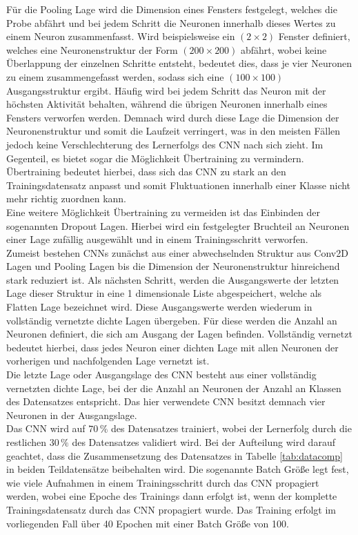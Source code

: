 Für die Pooling Lage wird die Dimension eines Fensters festgelegt, welches die Probe abfährt und bei jedem Schritt die Neuronen innerhalb dieses Wertes zu einem Neuron zusammenfasst. Wird beispielsweise ein $(2\times 2)$ Fenster definiert, welches eine Neuronenstruktur der Form $(200 \times 200)$ abfährt, wobei keine Überlappung der einzelnen Schritte entsteht, bedeutet dies, dass je vier Neuronen zu einem zusammengefasst werden, sodass sich eine $(100\times 100)$ Ausgangsstruktur ergibt. Häufig wird bei jedem Schritt das Neuron mit der höchsten Aktivität behalten, während die übrigen Neuronen innerhalb eines Fensters verworfen werden. Demnach wird durch diese Lage die Dimension der Neuronenstruktur und somit die Laufzeit verringert, was in den meisten Fällen jedoch keine Verschlechterung des Lernerfolgs des CNN nach sich zieht. Im Gegenteil, es bietet sogar die Möglichkeit Übertraining zu vermindern. Übertraining bedeutet hierbei, dass sich das CNN zu stark an den Trainingsdatensatz anpasst und somit Fluktuationen innerhalb einer Klasse nicht mehr richtig zuordnen kann. \\
Eine weitere Möglichkeit Übertraining zu vermeiden ist das Einbinden der sogenannten Dropout Lagen. Hierbei wird ein festgelegter Bruchteil an Neuronen einer Lage zufällig ausgewählt und in einem Trainingsschritt verworfen. \\
Zumeist bestehen CNNs zunächst aus einer abwechselnden Struktur aus Conv2D Lagen und Pooling Lagen bis die Dimension der Neuronenstruktur hinreichend stark reduziert ist. Als nächsten Schritt, werden die Ausgangswerte der letzten Lage dieser Struktur in eine 1 dimensionale Liste abgespeichert, welche als Flatten Lage bezeichnet wird. Diese Ausgangswerte werden wiederum in vollständig vernetzte dichte Lagen übergeben. Für diese werden die Anzahl an Neuronen definiert, die sich am Ausgang der Lagen befinden. Vollständig vernetzt bedeutet hierbei, dass jedes Neuron einer dichten Lage mit allen Neuronen der vorherigen und nachfolgenden Lage vernetzt ist.  \\
Die letzte Lage oder Ausgangslage des CNN besteht aus einer vollständig vernetzten dichte Lage, bei der die Anzahl an Neuronen der Anzahl an Klassen des Datensatzes entspricht. Das hier verwendete CNN besitzt demnach vier Neuronen in der Ausgangslage. \\
Das CNN wird auf $70\,\%$ des Datensatzes trainiert, wobei der Lernerfolg durch die restlichen $30\,\%$ des Datensatzes validiert wird. Bei der Aufteilung wird darauf geachtet, dass die Zusammensetzung des Datensatzes in Tabelle \ref{tab:datacomp} in beiden Teildatensätze beibehalten wird. Die sogenannte Batch Größe legt fest, wie viele Aufnahmen in einem Trainingsschritt durch das CNN propagiert werden, wobei eine Epoche des Trainings dann erfolgt ist, wenn der komplette Trainingsdatensatz durch das CNN propagiert wurde. Das Training erfolgt im vorliegenden Fall über 40 Epochen mit einer Batch Größe von 100. \\ 
